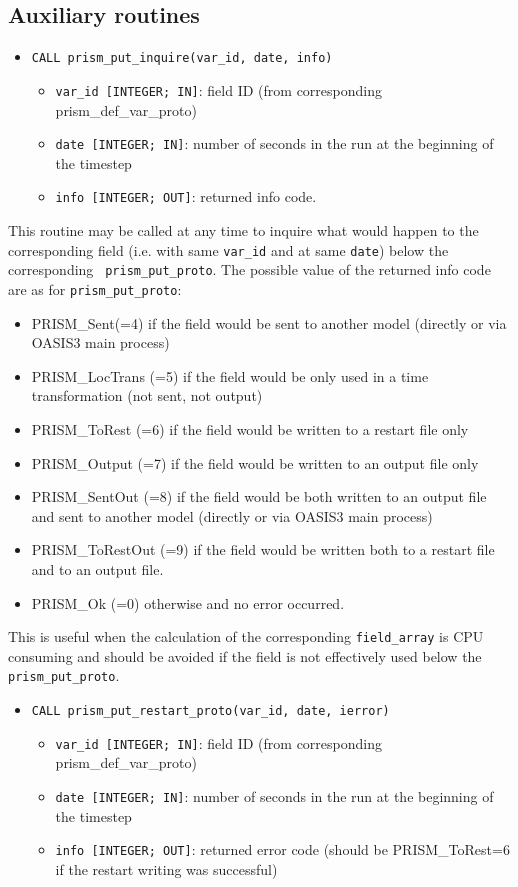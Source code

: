 \subsection{Auxiliary routines}
\label{subsec:auxiliary}
\begin{itemize} 
\item {\tt CALL prism\_put\_inquire(var\_id, date, info)}
\begin{itemize}
\item {\tt var\_id [INTEGER; IN]}: field ID (from
  corresponding prism\_def\_var\_proto)
\item {\tt date [INTEGER; IN]}: number of seconds in the run at the
beginning of the timestep 
\item {\tt info [INTEGER; OUT]}: returned info code. 
\end{itemize}
\end{itemize}

This routine may be called at any time to
inquire what would happen to the corresponding field (i.e. with same
{\tt var\_id} and at same {\tt date}) below the corresponding {\tt
  prism\_put\_proto}. The possible value of the returned info code are
as for {\tt prism\_put\_proto}:   
\begin{itemize}
      \item PRISM\_Sent(=4) if the field would be sent to another model 
      (directly or via OASIS3 main process)
      \item PRISM\_LocTrans (=5) if the field would be only used in a time
       transformation (not sent, not output)
      \item PRISM\_ToRest (=6) if the field would be written to a restart file only
      \item PRISM\_Output (=7) if the field would be written to an output file only
      \item PRISM\_SentOut (=8) if the field would be both written to an output file
       and sent to another model (directly or via OASIS3 main process)
      \item PRISM\_ToRestOut (=9) if the field would be written both to a
       restart file and to an output file.
      \item PRISM\_Ok (=0) otherwise and no error occurred. 
\end{itemize}
This is useful when the
calculation of the corresponding {\tt field\_array} is CPU consuming
and should be avoided if the field is not effectively used below the {\tt
prism\_put\_proto}.

\begin{itemize} 
\item {\tt CALL prism\_put\_restart\_proto(var\_id, date, ierror)}
\begin{itemize}
\item {\tt var\_id [INTEGER; IN]}: field ID (from
  corresponding prism\_def\_var\_proto)
\item {\tt date [INTEGER; IN]}: number of seconds in the run at the
beginning of the timestep
\item {\tt info [INTEGER; OUT]}: returned error code (should be
  PRISM\_ToRest=6 if the restart writing was successful)
\end{itemize}
\end{itemize}

